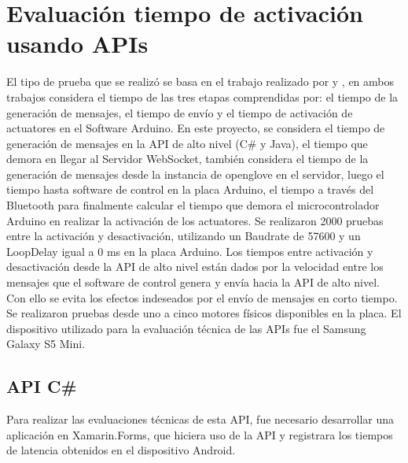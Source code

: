 \section{Evaluación tiempo de activación usando APIs}
El tipo de prueba que se realizó se basa en el trabajo realizado por  \cite{tesis-monsalve-rodrigo} y  \cite{tesis-meneses-sebastian}, en ambos trabajos considera el tiempo de las tres etapas comprendidas por: el tiempo de la generación de mensajes, el tiempo de envío y el tiempo de activación de actuatores en el Software Arduino. En este proyecto, se considera el tiempo de generación de mensajes en la API de alto nivel (C\# y Java), el tiempo que demora en llegar al Servidor WebSocket, también considera el tiempo de la generación de mensajes desde la instancia de openglove en el servidor, luego el tiempo hasta software de control en la placa Arduino, el tiempo a través del Bluetooth para finalmente calcular el tiempo que demora el microcontrolador Arduino en realizar la activación de los actuatores. Se realizaron 2000 pruebas entre la activación y desactivación, utilizando un Baudrate de 57600 y un LoopDelay igual a 0 ms en la placa Arduino. Los tiempos entre activación y desactivación desde la API de alto nivel están dados por la velocidad entre los mensajes que el software de control genera y envía hacia la API de alto nivel. Con ello se evita los efectos indeseados por el envío de mensajes en corto tiempo. %
Se realizaron pruebas desde uno a cinco motores físicos disponibles en la placa. El dispositivo utilizado para la evaluación técnica de las APIs fue el Samsung Galaxy S5 Mini.
 
\subsection{API C\#}
Para realizar las evaluaciones técnicas de esta API, fue necesario desarrollar una aplicación en Xamarin.Forms, que hiciera uso de la API y registrara los tiempos de latencia obtenidos en el dispositivo Android.




